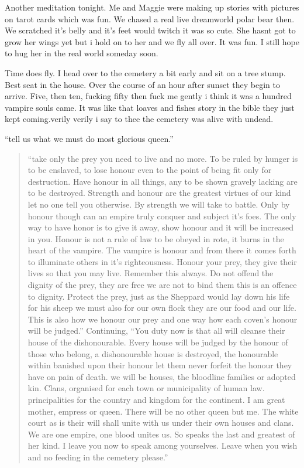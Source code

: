 Another meditation tonight. Me and Maggie were making up stories with pictures on tarot cards which was fun. We chased a real live dreamworld polar bear then. We scratched it's belly and it's feet would twitch it was so cute. She hasnt got to grow her wings yet but i hold on to her and we fly all over. It was fun. I still hope to hug her in the real world someday soon.

Time does fly. I head over to the cemetery a bit early and sit on a tree stump. Best seat in the house. Over the course of an hour after sunset they begin to arrive. Five, then ten, fucking fifty then fuck me gently i think it was a hundred vampire souls came.  It was like that loaves and fishes story in the bible they just kept coming.verily verily i say to thee the cemetery was alive with undead.

``tell us what we must do most glorious queen.''

\begin{quotation}
``take only the prey you need to live and no more. To be ruled by hunger is to be enslaved, to lose honour even to the point of being fit only for destruction. Have honour in all things, any to be shown gravely lacking are to be destroyed. Strength and honour are the greatest virtues of our kind let no one tell you otherwise. By strength we will take to battle. Only by honour though can an empire truly conquer and subject it's foes. The only way to have honor is to give it away, show honour and it will be increased in you. Honour is not a rule of law to be obeyed in rote, it burns in the heart of the vampire. The vampire is honour and from there it comes forth to illuminate others in it's righteousness. Honour your prey, they give their lives so that you may live. Remember this always. Do not offend the dignity of the prey, they are free we are not to bind them this is an offence to dignity. Protect the prey, just as the Sheppard would lay down his life for his sheep we must also for our own flock they are our food and our life. This is also how we honour our prey and one way how each coven's honour will be judged.''
Continuing, ``You duty now is that all will cleanse their house of the dishonourable. Every house will be judged  by the honour of those who belong, a dishonourable house is destroyed, the honourable within banished upon their honour let them never forfeit the honour they have on pain of death. we will be houses, the bloodline families or adopted kin. Clans, organised for each town or municipality of human law. principalities for the country and kingdom for the continent. I am great mother, empress or queen. There will be no other queen but me. The white court as is their will shall unite with us under their own houses and clans. We are one empire, one blood unites us. So speaks the last and greatest of her kind. I leave you now to speak among yourselves. Leave when you wish and no feeding in the cemetery please.''
\end{quotation}

